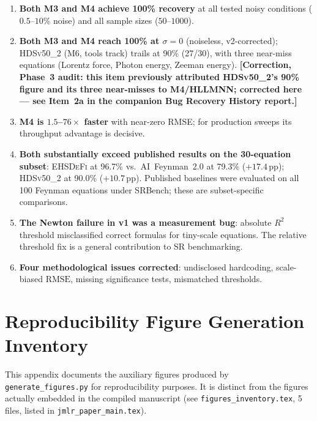 \documentclass[twoside,11pt]{article}
\newcommand{\EHD}{\textsc{EHSDeFi}}
\newcommand{\HSL}{\textsc{HLLMNN}}
\newcommand{\HDS}{\textsc{HDSv50\_2}}
\newcommand{\Rsq}{R^{2}}
\newcommand{\rmse}{\ensuremath{\mathrm{RMSE}}}
\begin{document}
\begin{enumerate}
  \item \textbf{Both M3 and M4 achieve 100\% recovery} at all tested noisy
    conditions ($0.5$--$10\%$ noise) and all sample sizes ($50$--$1000$).
  \item \textbf{Both M3 and M4 reach 100\% at $\sigma=0$} (noiseless,
    v2-corrected); \HDS{} (M6, tools track) trails at 90\% (27/30), with
    three near-miss equations (Lorentz force, Photon energy, Zeeman energy).
    \textbf{[Correction, Phase~3 audit: this item previously attributed
    \HDS's 90\% figure and its three near-misses to M4/\HSL; corrected here
    --- see Item~2a in the companion Bug Recovery History report.]}
  \item \textbf{M4 is $1.5$--$76\times$ faster} with near-zero RMSE; for
    production sweeps its throughput advantage is decisive.
  \item \textbf{Both substantially exceed published results on the 30-equation subset}:
    \EHD{} at 96.7\% vs.\ AI~Feynman~2.0 at 79.3\% ($+17.4$\,pp); \HDS{}
    at 90.0\% ($+10.7$\,pp).  Published baselines were evaluated on all 100
    Feynman equations under SRBench; these are subset-specific comparisons.
  \item \textbf{The Newton failure in v1 was a measurement bug}: absolute
    $\Rsq$ threshold misclassified correct formulas for tiny-scale equations.
    The relative threshold fix is a general contribution to SR benchmarking.
  \item \textbf{Four methodological issues corrected}: undisclosed hardcoding,
    scale-biased \rmse, missing significance tests, mismatched thresholds.
\end{enumerate}



\appendix

\section{Reproducibility Figure Generation Inventory}
\label{app:figures}

\noindent This appendix documents the auxiliary figures produced by
\texttt{generate\_figures.py} for reproducibility purposes. It is
distinct from the figures actually embedded in the compiled
manuscript (see \texttt{figures\_inventory.tex}, 5 files, listed in
\texttt{jmlr\_paper\_main.tex}).
\end{document}
